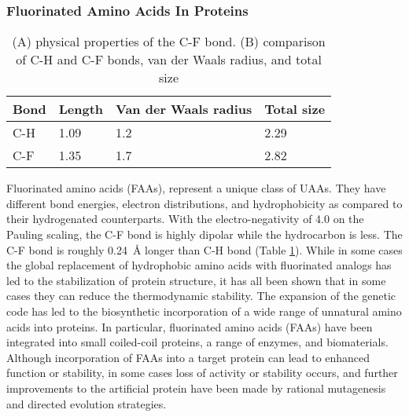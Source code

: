 \begin{refsection}
\subsubsection{Fluorinated Amino Acids In Proteins} 
\label{sec:faa-intro}

\begin{table}[h!]
\centering
\begin{tabular}{ llll }
  \hline
  Bond & Length & Van der Waals radius & Total size \\
  \hline

  C-H & 1.09 & 1.2 & 2.29 \\
  C-F & 1.35 & 1.7 & 2.82 \\

  \hline
\end{tabular}
\caption[(A) physical properties of the C-F bond. (B) comparison of C-H and C-F
bonds, van der Waals radius, and total size]{(A) physical properties of the C-F
bond. (B) comparison of C-H and C-F bonds, van der Waals radius, and total
size\cite{Tang2001,Odar2015}}
\label{tab:c-fbond}
\end{table}

Fluorinated amino acids (FAAs), represent a unique class of UAAs. They have
different bond energies, electron distributions, and
hydrophobicity\cite{Biffinger2004} as compared to their hydrogenated
counterparts. With the electro-negativity of 4.0 on the Pauling scaling, the
C-F bond is highly dipolar while the hydrocarbon is less. The C-F bond is
roughly \SI{0.24}{\angstrom} longer than C-H bond (Table
\ref{tab:c-fbond})\cite{Tang2001}. While in some cases the global replacement
of hydrophobic amino acids with fluorinated analogs has led to the
stabilization of protein structure\cite{Biffinger2004}, it has all been shown
that in some cases they can reduce the thermodynamic
stability\cite{Panchenko2006b}. The expansion of the genetic code has led to
the biosynthetic incorporation of a wide range of unnatural amino acids into
proteins\cite{Voloshchuk2010}. In particular, fluorinated amino acids (FAAs)
have been integrated into small coiled-coil
proteins\cite{Montclare2009b,Tang2001}, a range of
enzymes\cite{Voloshchuk2009,Panchenko2006b,Voloshchuk2007b,Mehta2011b,Hammill2007},
and biomaterials\cite{Yuvienco2012b}. Although incorporation of FAAs into a
target protein can lead to enhanced function or stability, in some cases loss
of activity or stability occurs, and further improvements to the artificial
protein have been made by rational mutagenesis\cite{Voloshchuk2007b} and
directed evolution strategies\cite{Montclare2006b}.


\end{refsection}
